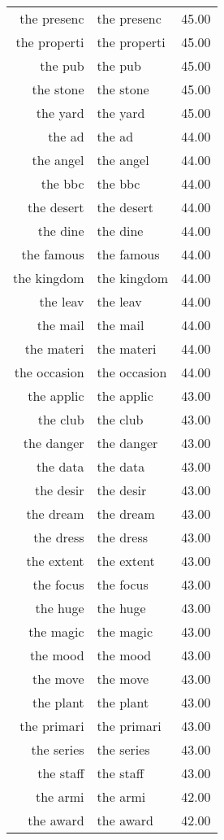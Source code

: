 \begin{table}[ht]
\begin{tabular}{rlr}
  the presenc & the presenc & 45.00 \\ 
  the properti & the properti & 45.00 \\ 
  the pub & the pub & 45.00 \\ 
  the stone & the stone & 45.00 \\ 
  the yard & the yard & 45.00 \\ 
  the ad & the ad & 44.00 \\ 
  the angel & the angel & 44.00 \\ 
  the bbc & the bbc & 44.00 \\ 
  the desert & the desert & 44.00 \\ 
  the dine & the dine & 44.00 \\ 
  the famous & the famous & 44.00 \\ 
  the kingdom & the kingdom & 44.00 \\ 
  the leav & the leav & 44.00 \\ 
  the mail & the mail & 44.00 \\ 
  the materi & the materi & 44.00 \\ 
  the occasion & the occasion & 44.00 \\ 
  the applic & the applic & 43.00 \\ 
  the club & the club & 43.00 \\ 
  the danger & the danger & 43.00 \\ 
  the data & the data & 43.00 \\ 
  the desir & the desir & 43.00 \\ 
  the dream & the dream & 43.00 \\ 
  the dress & the dress & 43.00 \\ 
  the extent & the extent & 43.00 \\ 
  the focus & the focus & 43.00 \\ 
  the huge & the huge & 43.00 \\ 
  the magic & the magic & 43.00 \\ 
  the mood & the mood & 43.00 \\ 
  the move & the move & 43.00 \\ 
  the plant & the plant & 43.00 \\ 
  the primari & the primari & 43.00 \\ 
  the series & the series & 43.00 \\ 
  the staff & the staff & 43.00 \\ 
  the armi & the armi & 42.00 \\ 
  the award & the award & 42.00 \\ 

\end{tabular}
\end{table}

